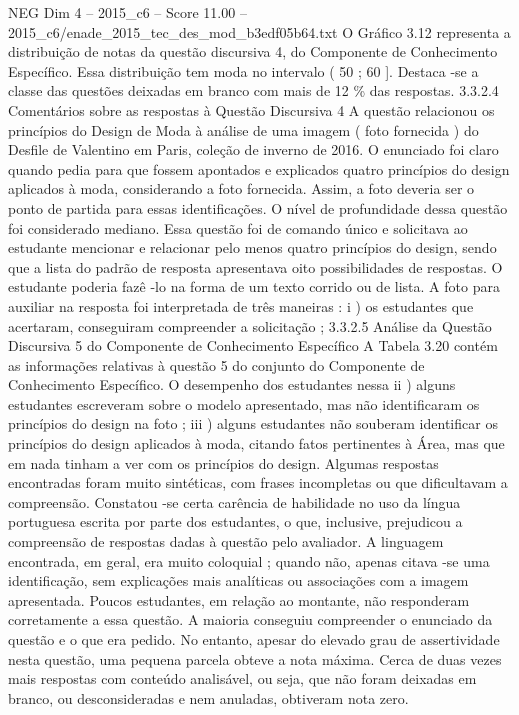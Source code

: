 \begin{textsample}{NEG Dim 4 – 2015\_c6 – Score 11.00 – 2015\_c6/enade\_2015\_tec\_des\_mod\_b3edf05b64.txt}
O Gráfico 3.12 representa a distribuição de notas da questão discursiva 4, do Componente de Conhecimento Específico.
Essa distribuição tem moda no intervalo ( 50 ; 60 ].
Destaca -se a classe das questões deixadas em branco com mais de 12 \% das respostas. 3.3.2.4 Comentários sobre as respostas à Questão Discursiva 4 A questão relacionou os princípios do Design de Moda à análise de uma imagem ( foto fornecida ) do Desfile de Valentino em Paris, coleção de inverno de 2016.
O enunciado foi claro quando pedia para que fossem apontados e explicados quatro princípios do design aplicados à moda, considerando a foto fornecida.
Assim, a foto deveria ser o ponto de partida para essas identificações.
O nível de profundidade dessa questão foi considerado mediano.
Essa questão foi de comando único e solicitava ao estudante mencionar e relacionar pelo menos quatro princípios do design, sendo que a lista do padrão de resposta apresentava oito possibilidades de respostas.
O estudante poderia fazê -lo na forma de um texto corrido ou de lista.
A foto para auxiliar na resposta foi interpretada de três maneiras : i ) os estudantes que acertaram, conseguiram compreender a solicitação ; 3.3.2.5 Análise da Questão Discursiva 5 do Componente de Conhecimento Específico A Tabela 3.20 contém as informações relativas à questão 5 do conjunto do Componente de Conhecimento Específico.
O desempenho dos estudantes nessa ii ) alguns estudantes escreveram sobre o modelo apresentado, mas não identificaram os princípios do design na foto ; iii ) alguns estudantes não souberam identificar os princípios do design aplicados à moda, citando fatos pertinentes à Área, mas que em nada tinham a ver com os princípios do design.
Algumas respostas encontradas foram muito sintéticas, com frases incompletas ou que dificultavam a compreensão.
Constatou -se certa carência de habilidade no uso da língua portuguesa escrita por parte dos estudantes, o que, inclusive, prejudicou a compreensão de respostas dadas à questão pelo avaliador.
A linguagem encontrada, em geral, era muito coloquial ; quando não, apenas citava -se uma identificação, sem explicações mais analíticas ou associações com a imagem apresentada.
Poucos estudantes, em relação ao montante, não responderam corretamente a essa questão.
A maioria conseguiu compreender o enunciado da questão e o que era pedido.
No entanto, apesar do elevado grau de assertividade nesta questão, uma pequena parcela obteve a nota máxima.
Cerca de duas vezes mais respostas com conteúdo analisável, ou seja, que não foram deixadas em branco, ou desconsideradas e nem anuladas, obtiveram nota zero.

\end{textsample}
